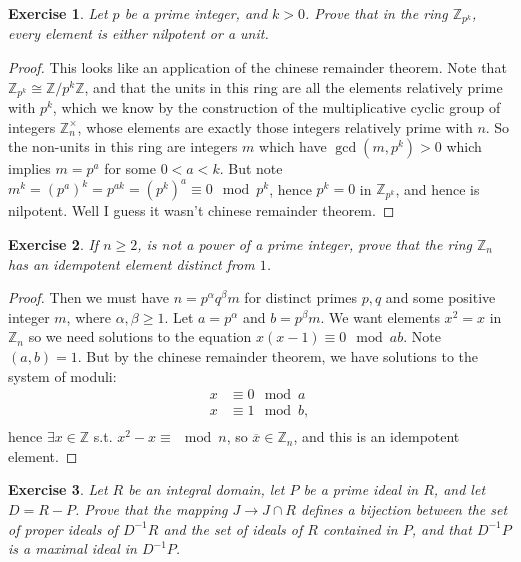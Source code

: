 \documentclass[10pt,oneside,reqno]{amsart}
\theoremstyle{plain}
\newtheorem{e}{Exercise}
\theoremstyle{definition}
\newcommand{\z}{\mathbb{Z}}
\begin{document}
\begin{e}
Let $p$ be a prime integer, and $k> 0$. Prove that in the ring $\z_{p^k}$, every element is either nilpotent or a unit. 
\end{e}

\begin{proof}
This looks like an application of the chinese remainder theorem. Note that $\z_{p^k} \cong \z/p^k\z$, and that the units in this ring are all the elements relatively prime with $p^k$, which we know by the construction of the multiplicative cyclic group of integers $\z_n^\times$, whose elements are exactly those integers relatively prime with $n$. So the non-units in this ring are integers $m$ which have $\gcd(m,p^k) > 0$  which implies $m = p^a$ for some $0 < a < k$. But note $m^k = (p^a)^k = p^{ak} = (p^k)^a \equiv 0 \mod p^k$, hence $p^k = 0$ in $\z_{p^k}$, and hence is nilpotent. Well I guess it wasn't chinese remainder theorem. 
\end{proof}

\begin{e}
If $n \geq 2$, is not a power of a prime integer, prove that the ring $\z_n$ has an idempotent element distinct from $1$. 
\end{e}
\begin{proof}
 Then we must have $n = p^\alpha q^\beta m$ for distinct primes $p,q$ and some positive integer $m$, where $\alpha ,\beta \geq 1$. Let $a = p^\alpha$ and $b = p^\beta m$. We want elements $x^2 = x$ in $\z_n$ so we need solutions to the equation $x(x - 1) \equiv 0 \mod ab$. Note $(a,b) = 1$. But by the chinese remainder theorem, we have solutions to the system of moduli:
 \begin{equation}
\begin{aligned}
x &\equiv 0 \mod a\\
x &\equiv 1 \mod b,\\
\end{aligned}
\end{equation}
hence $\exists x \in \z$ s.t. $x^2 - x \equiv \mod n$, so $\overline{x} \in \z_n$, and this is an idempotent element. 
\end{proof}

\begin{e}
Let $R$ be an integral domain, let $P$ be a prime ideal in $R$, and let $D = R - P$. Prove that the mapping $J \to J \cap R$ defines a bijection between the set of proper ideals of $D^{-1}R$ and the set of ideals of $R$ contained in $P$, and that $D^{-1}P$ is a maximal ideal in $D^{-1}P$. 
\end{e}
\end{document}
